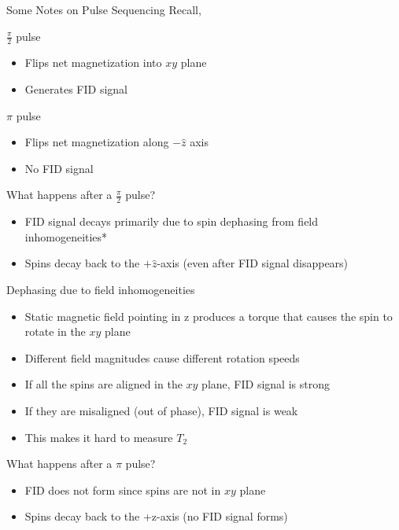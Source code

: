 \documentclass[aspectratio=169,xcolor=dvipsnames]{beamer}
\newcommand{\halfpi}{\frac{\pi}{2}}
\begin{document}
\begin{frame}{Some Notes on Pulse Sequencing}
    Recall,
    \begin{alertblock}{$\halfpi$ pulse}
        \begin{itemize}
            \item Flips net magnetization into $xy$ plane
            \item Generates FID signal
        \end{itemize}
    \end{alertblock}

    \begin{alertblock}{$\pi$ pulse}
        \begin{itemize}
            \item Flips net magnetization along $-\hat{z}$ axis
            \item No FID signal
        \end{itemize}
    \end{alertblock}
\end{frame}

\begin{frame}{What happens after a $\halfpi$ pulse?}
    \begin{itemize}
        \item FID signal decays primarily due to spin dephasing from field inhomogeneities* 
        \item Spins decay back to the $+\hat{z}$-axis (even after FID signal disappears)
    \end{itemize}
\end{frame}

\begin{frame}{Dephasing due to field inhomogeneities}
    \begin{itemize}
        \item Static magnetic field pointing in z produces a torque that causes the spin to rotate in the $xy$ plane 
        \item Different field magnitudes cause different rotation speeds 
        \item If all the spins are aligned in the $xy$ plane, FID signal is strong
        \item If they are misaligned (out of phase), FID signal is weak
        \item This makes it hard to measure $T_2$
    \end{itemize}
\end{frame}

\begin{frame}{What happens after a $\pi$ pulse?}
    \begin{itemize}
        \item FID does not form since spins are not in $xy$ plane
        \item Spins decay back to the +z-axis (no FID signal forms) 
    \end{itemize}
\end{frame}
\end{document}
